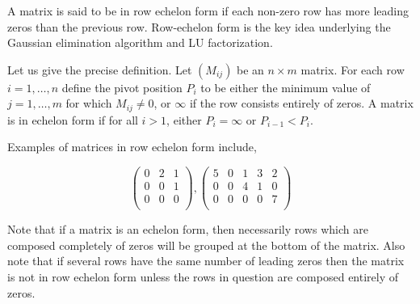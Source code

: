 \documentclass{article}
\begin{document}
A matrix is said to be in row echelon form if each non-zero row has more leading zeros than the previous row.   Row-echelon form is the key idea underlying the Gaussian elimination algorithm and LU factorization.

Let us give the precise definition.  Let $(M_{ij})$ be an $n\times m$
matrix. For each row $i=1,\ldots,n$ define the pivot position $P_i$ to
be either the minimum value of $j=1,\ldots, m$ for which $M_{ij}\neq
0$, or $\infty$ if the row consists entirely of zeros.  A matrix is in
echelon form if for all $i>1$, either $P_i=\infty$ or $P_{i-1}<P_i$.

Examples of matrices in row echelon form include,

\begin{displaymath}
\left( \begin{array}{ccc}
 0 & 2 & 1 \\
 0 & 0 & 1 \\
 0 & 0 & 0 \\
\end{array}
\right)
,\left( \begin{array}{ccccc}
 5 & 0 & 1 & 3 & 2 \\
 0 & 0 & 4 & 1 & 0 \\
 0 & 0 & 0 & 0 & 7 \\
\end{array} \right)
\end{displaymath}

Note that if a matrix is an echelon form, then necessarily rows which
are composed completely of zeros will be grouped at the bottom of the
matrix.  Also note that if several rows have the same number of
leading zeros then the matrix is not in row echelon form unless the
rows in question are composed entirely of zeros.
\end{document}
